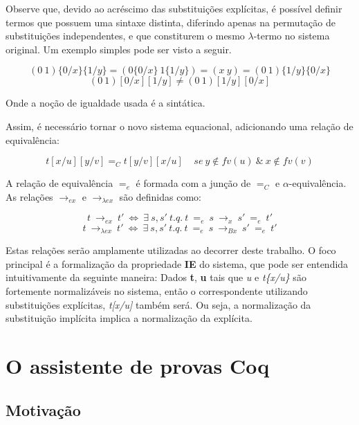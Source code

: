 Observe que, devido ao acréscimo das substituições explícitas, é possível
definir termos que possuem uma sintaxe distinta, diferindo apenas na permutação
de substituições independentes, e que constiturem o mesmo
$\lambda$-termo no sistema original. Um exemplo simples pode ser visto a seguir.

\[ (0\ 1) \{0/x\}\{1/y\} = (0\{0/x\}\ 1\{1/y\}) = (x\ y) =  (0\ 1) \{1/y\}\{0/x\} \]
\[ (0\ 1) [0/x][1/y] \neq  (0\ 1) [1/y][0/x] \]

Onde a noção de igualdade usada é a sintática.

Assim, é necessário tornar o novo sistema
equacional, adicionando uma relação de equivalência:

\[ t[x/u][y/v] =_C t[y/v][x/u] \ \ \ \ \ se\ y \notin fv(u)\ \&\ x \notin fv(v)\] 

A relação de equivalência $=_e$ é formada com a junção de $=_C$ e
$\alpha$-equivalência. As relações $\rightarrow_{ex}$ e $\rightarrow_{\lambda
    ex}$ são definidas como:

\[t\ \rightarrow_{ex}\ t'\ \iff\ \exists\ s,s'\ t.q.\ t\ =_{e}\ s\
    \rightarrow_x\ s'\ =_e\ t' \]
\[t\ \rightarrow_{\lambda ex}\ t'\ \iff\ \exists\ s,s'\ t.q.\ t\ =_{e}\ s\
    \rightarrow_{Bx}\ s'\ =_e\ t' \]

Estas relações serão amplamente utilizadas ao decorrer deste trabalho. 
O foco principal é a formalização da propriedade \textbf{IE} do sistema, que
pode ser entendida intuitivamente da seguinte maneira: Dados \textbf{t},
\textbf{u} tais que \emph{u} e \emph{t\{x/u\}} são fortemente normalizáveis
no sistema, então o correspondente utilizando substituições explícitas,
\emph{t[x/u]} também será. Ou seja, a normalização da substituição implícita
implica a normalização da explícita.


\section{O assistente de provas Coq} 
\subsection{Motivação}


